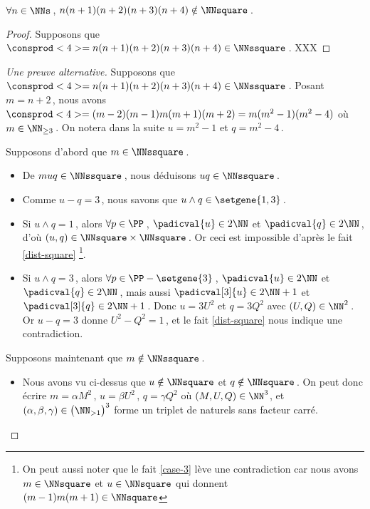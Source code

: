 \begin{fact}
	 $\forall n \in \NNs$\,, $n(n+1)(n+2)(n+3)(n+4) \notin \NNsquare$\,.
\end{fact}


\begin{proof}
    Supposons que $\consprod<4> = n(n+1)(n+2)(n+3)(n+4) \in \NNssquare$\,.
	XXX
\end{proof}




\begin{proof}[Une preuve alternative]
	Supposons que $\consprod<4> = n(n+1)(n+2)(n+3)(n+4) \in \NNssquare$\,.
	Posant $m = n+2$\,, nous avons $\consprod<4> = (m-2)(m-1)m(m+1)(m+2) = m(m^2 - 1)(m^2 - 4)$ où $m \in \NN_{\geq 3}$\,.
	On notera dans la suite $u = m^2 - 1$ et $q = m^2 - 4$\,.
	
	\medskip
	
	Supposons d'abord que $m \in \NNssquare$\,.
	\begin{itemize}
		\item De $muq \in \NNssquare$\,, nous déduisons $uq \in \NNssquare$\,.

		\item Comme $u - q = 3$\,, nous savons que $u \wedge q \in \setgene{1, 3}$\,.

		\item Si $u \wedge q = 1$\,, 
		alors $\forall p \in \PP$\,, 
		$\padicval{u} \in 2 \NN$ et $\padicval{q} \in 2 \NN$\,,
		d'où 
		$(u, q) \in \NNsquare \times \NNsquare$\,.
		Or ceci est impossible d'après le fait \ref{dist-square}
		\footnote{
			On peut aussi noter que le fait \ref{case-3} lève une contradiction car nous avons $m \in \NNsquare$ et $u \in \NNsquare$ qui donnent $(m-1)m(m+1) \in \NNsquare$
		}.

		\item Si $u \wedge q = 3$\,, 
		alors $\forall p \in \PP - \setgene{3}$\,, 
		$\padicval{u} \in 2 \NN$ et $\padicval{q} \in 2 \NN$\,,
		mais aussi $\padicval[3]{u} \in 2 \NN + 1$ et $\padicval[3]{q} \in 2 \NN + 1$\,.
		Donc 
		$u = 3 U^2$ et $q = 3 Q^2$ avec $(U, Q) \in \NN^2$\,.
		Or $u - q = 3$ donne $U^2 - Q^2 = 1$\,, et le fait \ref{dist-square} nous indique une contradiction.
	\end{itemize}
	
	\medskip
	
	Supposons maintenant que $m \notin \NNssquare$\,.
	\begin{itemize}
		\item Nous avons vu ci-dessus que $u \notin \NNsquare$ et $q \notin \NNsquare$\,. On peut donc écrire $m = \alpha M^2$\,, $u = \beta U^2$\,, $q = \gamma Q^2$ où $(M, U, Q) \in \NN^3$, et $(\alpha, \beta, \gamma) \in \big( \NN_{>1} \big)^3$ forme un triplet de naturels sans facteur carré.



\end{itemize}
\end{proof}
